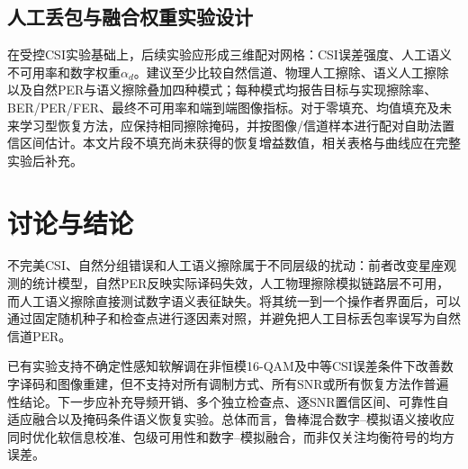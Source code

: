 \documentclass[conference]{IEEEtran}
\begin{document}
\subsection{人工丢包与融合权重实验设计}
在受控CSI实验基础上，后续实验应形成三维配对网格：CSI误差强度、人工语义不可用率和数字权重$\alpha_d$。建议至少比较自然信道、物理人工擦除、语义人工擦除以及自然PER与语义擦除叠加四种模式；每种模式均报告目标与实现擦除率、BER/PER/FER、最终不可用率和端到端图像指标。对于零填充、均值填充及未来学习型恢复方法，应保持相同擦除掩码，并按图像/信道样本进行配对自助法置信区间估计。本文片段不填充尚未获得的恢复增益数值，相关表格与曲线应在完整实验后补充。

\section{讨论与结论}
不完美CSI、自然分组错误和人工语义擦除属于不同层级的扰动：前者改变星座观测的统计模型，自然PER反映实际译码失效，人工物理擦除模拟链路层不可用，而人工语义擦除直接测试数字语义表征缺失。将其统一到一个操作者界面后，可以通过固定随机种子和检查点进行逐因素对照，并避免把人工目标丢包率误写为自然信道PER。

已有实验支持不确定性感知软解调在非恒模16-QAM及中等CSI误差条件下改善数字译码和图像重建，但不支持对所有调制方式、所有SNR或所有恢复方法作普遍性结论。下一步应补充导频开销、多个独立检查点、逐SNR置信区间、可靠性自适应融合以及掩码条件语义恢复实验。总体而言，鲁棒混合数字--模拟语义接收应同时优化软信息校准、包级可用性和数字--模拟融合，而非仅关注均衡符号的均方误差。

\balance


\end{document}
